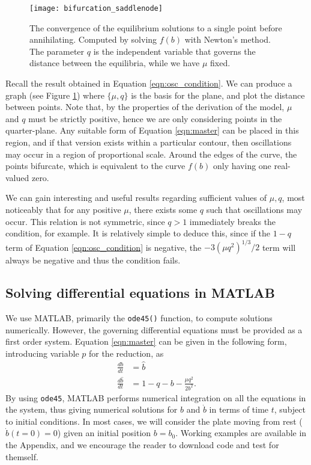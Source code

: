 \documentclass{article}
\begin{document}
\begin{figure}
	\centering
	\texttt{[image: bifurcation\_saddlenode]}
	\caption{
        The convergence of the equilibrium solutions to a single point before annihilating. Computed by solving \(f(b)\) with Newton's method.
        The parameter \(q\) is the independent variable that governs the distance between the equilibria, while we have \(\mu\) fixed.
    }
	\label{fig:param_space}
\end{figure}
Recall the result obtained in Equation \ref{eqn:osc_condition}.
We can produce a graph (see Figure \ref{fig:param_space}) where $\{\mu, q\}$ is the basis for the plane, and plot the distance between points.
Note that, by the properties of the derivation of the model,
$\mu$ and $q$ must be strictly positive,
hence we are only considering points in the quarter-plane.
Any suitable form of Equation \ref{eqn:master} can be placed in this region,
and if that version exists within a particular contour,
then oscillations may occur in a region of proportional scale.
Around the edges of the curve, the points bifurcate,
which is equivalent to the curve $f(b)$ only having one real-valued zero.

We can gain interesting and useful results regarding sufficient values of $\mu, q$,
most noticeably that for any positive $\mu$, there exists some $q$ such that oscillations may occur.
This relation is not symmetric, since $q>1$ immediately breaks the condition, for example.
It is relatively simple to deduce this, since if the $1-q$ term of Equation \ref{eqn:osc_condition} is negative,
the $-3(\mu q^2)^{1/3}/2$ term will always be negative and thus the condition fails.

\subsection{Solving differential equations in MATLAB}

We use MATLAB, primarily the \texttt{ode45()} function, to compute solutions numerically.
However, the governing differential equations must be provided as a first order system.
Equation \ref{eqn:master} can be given in the following form, introducing variable $p$ for the reduction, as
\begin{align}
    \frac{db}{dt}       & = \hat{b}                         \\
    \frac{d\hat{b}}{dt} & = 1 - q - b - \frac{\mu q^2}{2b^2}.
    \label{eqn:first_order_system}
\end{align}
By using \texttt{ode45}, MATLAB performs numerical integration on all the equations in the system,
thus giving numerical solutions for $b$ and $\dot{b}$ in terms of time $t$, subject to initial conditions.
In most cases, we will consider the plate moving from rest ($\dot{b}(t=0) = 0$) given an initial position $b=b_0$.
Working examples are available in the Appendix, and we encourage the reader to download code and test for themself.
\end{document}
